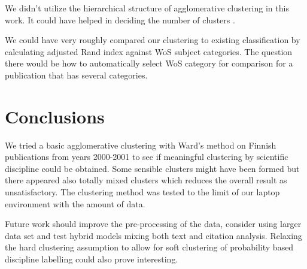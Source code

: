 We didn't utilize the hierarchical structure of agglomerative 
clustering in this work. 
It could have helped in deciding the number of clusters \cite{kimes_statistical_2017}.

We could have very roughly compared our clustering to existing 
classification by calculating adjusted Rand index against WoS 
subject categories.
The question there would be how to automatically select WoS 
category for comparison for a publication that has several 
categories.

\section*{Conclusions}
\label{sec:conclusions}
We tried a basic agglomerative clustering with Ward's method on 
Finnish publications from years 2000-2001 to see if meaningful 
clustering by scientific discipline could be obtained. Some 
sensible clusters might have been formed but there appeared also 
totally mixed clusters which reduces the overall result as 
unsatisfactory.
The clustering method was tested to the limit of our laptop 
environment with the amount of data.

Future work should improve the pre-processing of the data, consider 
using larger data set and test hybrid models mixing both text and
citation analysis. Relaxing the hard clustering assumption to 
allow for soft clustering of probability based discipline labelling
could also prove interesting.
